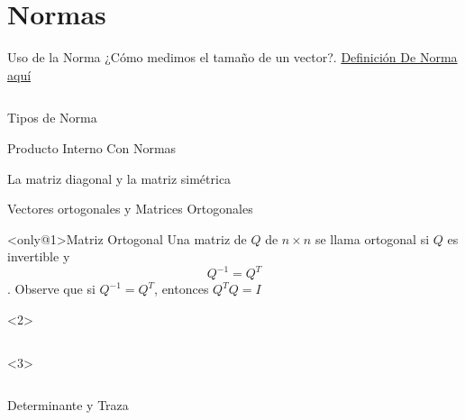  
\section{Normas}
\label{sec:norms}

\begin{frame}{Uso de la Norma}
  ¿Cómo medimos el tamaño de un vector?. \href{https://en.wikipedia.org/wiki/Norm_(mathematics)}{Definición De Norma aquí}

  \begin{columns}[t]
  
    
  \end{columns}

\end{frame}


\begin{frame}{Tipos de Norma}
    
\end{frame}

\begin{frame}{Producto Interno Con Normas}
  
\end{frame}

\begin{frame}{La matriz diagonal y la matriz simétrica}

\end{frame}

\begin{frame}{Vectores ortogonales y  Matrices Ortogonales}
  
  \begin{block}<only@1>{Matriz Ortogonal}\justifying
    Una matriz de $Q$ de $n\times n$ se llama \alert{ortogonal} si $Q$ es invertible y \[Q^{-1} = Q^{T} \]. Observe que si $Q^{-1} = Q^{T}$, entonces $Q^TQ = I$
  \end{block}

  \begin{onlyenv}<2>
    \begin{columns}[t]
      
      
    \end{columns}
  \end{onlyenv}
    \begin{onlyenv}<3>
    \begin{columns}[t]
      
      
    \end{columns}
  \end{onlyenv}

\end{frame}

\begin{frame}{Determinante y Traza}
  \only<1>{}
\end{frame}

